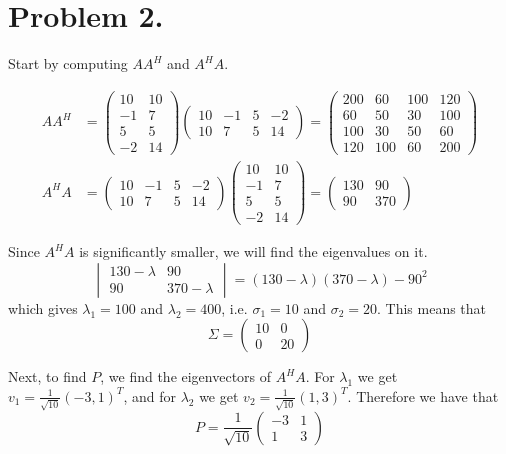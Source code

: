 \documentclass[a4paper,11pt]{article}
\begin{document}
\section*{Problem 2.}
Start by computing $AA^H$ and $A^H A$.

\begin{align*}
    AA^H &= \begin{pmatrix} 10 & 10 \\ -1 & 7  \\ 5  & 5  \\ -2 & 14 \end{pmatrix} \begin{pmatrix} 10 & -1 & 5 & -2 \\ 10 & 7  & 5 & 14 \end{pmatrix} = 
            \begin{pmatrix} 200 &  60 & 100 & 120 \\ 60 &  50 &  30 & 100 \\ 100 &  30 &  50 &  60 \\ 120 & 100 &  60 & 200 \end{pmatrix} \\
    A^HA &= \begin{pmatrix} 10 & -1 & 5 & -2 \\ 10 & 7  & 5 & 14 \end{pmatrix} \begin{pmatrix} 10 & 10 \\ -1 & 7  \\ 5  & 5  \\ -2 & 14 \end{pmatrix} = 
            \begin{pmatrix} 130 &  90 \\ 90 & 370 \end{pmatrix}
\end{align*}

Since $A^HA$ is significantly smaller, we will find the eigenvalues on it.
\[
    \begin{vmatrix}130 - \lambda & 90 \\ 90 & 370 - \lambda\end{vmatrix} = (130 - \lambda)(370 - \lambda) - 90^2
\]
which gives $\lambda_1 = 100$ and $\lambda_2 = 400$, i.e. $\sigma_1 = 10$ and $\sigma_2 = 20$.
This means that 
\[
    \Sigma = \begin{pmatrix}
        10 & 0 \\
        0  & 20
    \end{pmatrix}
\]

Next, to find $P$, we find the eigenvectors of $A^H A$. For $\lambda_1$ we get $v_1 = \frac{1}{\sqrt{10}}\left(-3, 1\right)^T$, and for 
$\lambda_2$ we get $v_2 = \frac{1}{\sqrt{10}}(1, 3)^T$. Therefore we have that
\[
    P = \frac{1}{\sqrt{10}}
    \begin{pmatrix}
        -3 & 1 \\    
        1  & 3
    \end{pmatrix}
\]
\end{document}
